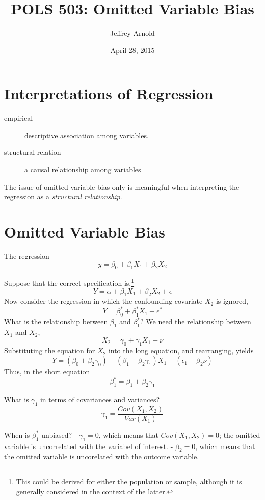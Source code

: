 \documentclass{tufte-handout}
\title{POLS 503: Omitted Variable Bias}
\author{Jeffrey Arnold}
\date{April 28, 2015}
\begin{document}
\maketitle



\section{Interpretations of
Regression}\label{interpretations-of-regression}

\begin{description}
\item[empirical]
descriptive association among variables.
\item[structural relation]
a causal relationship among variables
\end{description}

The issue of omitted variable bias only is meaningful when interpreting
the regression as a \emph{structural relationship}.

\section{Omitted Variable Bias}\label{omitted-variable-bias}

The regression \[
y = \beta_0 + \beta_1 X_1 + \beta_2 X_2
\]

Suppose that the correct specification is,\footnote{This could be
  derived for either the population or sample, although it is generally
  considered in the context of the latter.} \[
Y = \alpha + \beta_1 X_1 + \beta_2 X_2 + \epsilon
\] Now consider the regression in which the confounding covariate
\(X_2\) is ignored, \[
Y = \beta^*_0 + \beta^*_1 X_1 + \epsilon^*
\] What is the relationship between \(\beta_1\) and \(\beta^*_1\)? We
need the relationship between \(X_1\) and \(X_2\), \[
X_2 = \gamma_0 + \gamma_1 X_1 + \nu
\] Substituting the equation for \(X_2\) into the long equation, and
rearranging, yields \[
Y = (\beta_0 + \beta_2 \gamma_0) + (\beta_1 + \beta_2 \gamma_1) X_1 + (\epsilon_1 + \beta_2 \nu)
\] Thus, in the short equation \[
\beta^*_1 = \beta_1 + \beta_2 \gamma_1
\]

What is \(\gamma_1\) in terms of covariances and variances? \[
\gamma_1 = \frac{Cov(X_1, X_2)}{Var(X_1)}
\]

When is \(\beta^*_1\) unbiased? - \(\gamma_1 = 0\), which means that
\(Cov(X_1, X_2) = 0\); the omitted variable is uncorrelated with the
variabel of interest. - \(\beta_2 = 0\), which means that the omitted
variable is uncorelated with the outcome variable.
\end{document}
